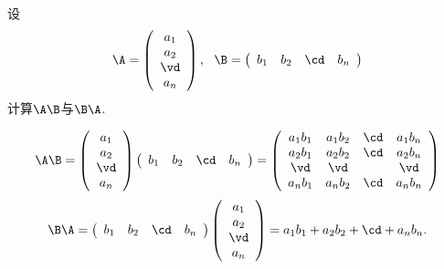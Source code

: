 \begin{li}
  设
  $$
  \A = \left(
    \begin{array}{c}
      a_1\\
      a_2\\
      \vd\\
      a_n
    \end{array}
  \right), ~~
  \B = \left(
    \begin{array}{cccc}
      b_1 & b_2 & \cd & b_n
    \end{array}
  \right)
  $$
  计算$\A\B$与$\B\A$.
\end{li}
\begin{jie}
  $$
  \A\B = \left(
    \begin{array}{c}
      a_1\\
      a_2\\
      \vd\\
      a_n
    \end{array}
  \right)\left(
    \begin{array}{cccc}
      b_1 & b_2 & \cd & b_n
    \end{array}
  \right) 
  = \left(
    \begin{array}{cccc}
      a_1b_1 & a_1b_2 & \cd & a_1b_n\\
      a_2b_1 & a_2b_2 & \cd & a_2b_n\\
      \vd & \vd & & \vd\\
      a_nb_1 & a_nb_2 & \cd & a_nb_n
    \end{array}
  \right)
  $$  
  $$
  \B\A = \left(
    \begin{array}{cccc}
      b_1 & b_2 & \cd & b_n
    \end{array}
  \right)\left(
    \begin{array}{c}
      a_1\\
      a_2\\
      \vd\\
      a_n
    \end{array}
  \right)  
  = a_1b_1+a_2b_2+\cd+a_nb_n.
  $$
\end{jie}

